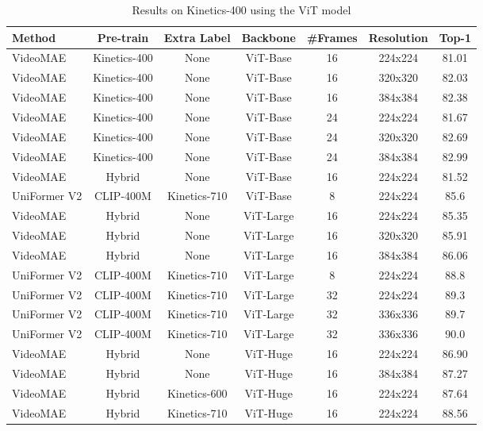 \begin{table}[t]
\centering
\small
\caption{Results on Kinetics-400 using the ViT model}
  \begin{tabular}{lcccccc}
    \toprule
     Method & Pre-train & Extra Label & Backbone & \#Frames & Resolution & Top-1\\
    \midrule
     VideoMAE & Kinetics-400 & None & ViT-Base & 16& 224x224 & 81.01 \\
     VideoMAE & Kinetics-400 & None & ViT-Base & 16& 320x320 & 82.03 \\
     VideoMAE & Kinetics-400 & None & ViT-Base & 16& 384x384 & 82.38 \\
     VideoMAE & Kinetics-400 & None & ViT-Base & 24& 224x224 & 81.67 \\
     VideoMAE & Kinetics-400 & None & ViT-Base & 24& 320x320 & 82.69 \\
     VideoMAE & Kinetics-400 & None & ViT-Base & 24& 384x384 & 82.99 \\
     VideoMAE & Hybrid & None & ViT-Base & 16& 224x224 & 81.52 \\
     UniFormer V2 & CLIP-400M & Kinetics-710 & ViT-Base & 8 & 224x224 & 85.6 \\
     \midrule
     VideoMAE & Hybrid & None & ViT-Large & 16& 224x224 & 85.35 \\
     VideoMAE & Hybrid & None & ViT-Large & 16& 320x320 & 85.91 \\
     VideoMAE & Hybrid & None & ViT-Large & 16& 384x384 & 86.06 \\
     UniFormer V2 & CLIP-400M & Kinetics-710 & ViT-Large & 8 & 224x224 & 88.8 \\
     UniFormer V2 & CLIP-400M &
     Kinetics-710 & ViT-Large & 32 & 224x224 & 89.3 \\
     UniFormer V2 & CLIP-400M &
     Kinetics-710 & ViT-Large & 32 & 336x336 & 89.7 \\
     UniFormer V2 & CLIP-400M &
     Kinetics-710 & ViT-Large & 32 & 336x336 & 90.0 \\
     \midrule
     VideoMAE & Hybrid & None & ViT-Huge & 16& 224x224 & 86.90 \\
     VideoMAE & Hybrid & None & ViT-Huge & 16& 384x384 & 87.27 \\
     VideoMAE & Hybrid & Kinetics-600 & ViT-Huge & 16& 224x224 & 87.64 \\
     VideoMAE & Hybrid & Kinetics-710 & ViT-Huge & 16& 224x224 & 88.56 \\

\end{tabular}
\end{table}
